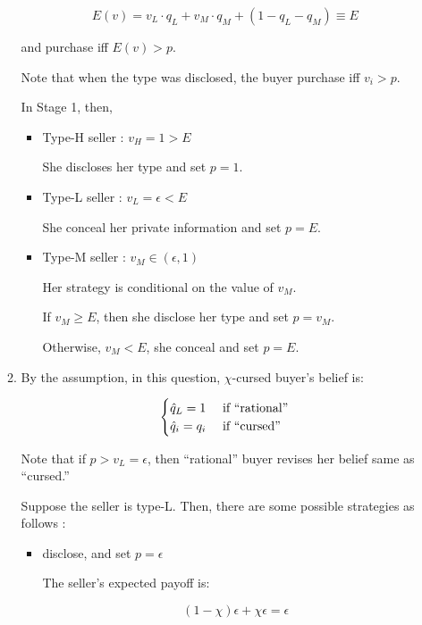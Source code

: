\documentclass{jsarticle}
\begin{document}
\begin{enumerate}
\begin{enumerate}
  \[E(v) = v_L \cdot q_L + v_M \cdot q_M + (1 - q_L - q_M) \equiv E \]
 
 and purchase iff $E(v) > p$.
 
 Note that when the type was disclosed, the buyer purchase iff $v_i > p$.
 
 \hspace{2zw} In Stage 1, then, 
 
  \begin{itemize}
  
  \item Type-H seller : $v_H =1 > E $
  
  She discloses her type and set $p = 1$.
  
  \item Type-L seller : $v_L = \epsilon < E$
  
  She conceal her private information and set $p = E$.
  
  \item Type-M seller : $v_M \in (\epsilon, 1)$
  
  Her strategy is conditional on the value of $v_M$.
  
  If $v_M \geq E$, then she disclose her type and set $p = v_M$.
  
  Otherwise, $v_M < E$, she conceal and set $p = E$.
  
  \end{itemize}
 
\vspace{1zw}

 \item By the assumption, in this question, $\chi$-cursed buyer's belief is:
 
 \[ \begin{cases}
 \Hat{q}_L = 1 & \text{ if ``rational''} \\
 \Hat{q}_i = q_i & \text{ if ``cursed''}
 \end{cases} \]
   
  Note that if $p > v_L = \epsilon$, then ``rational'' buyer revises her belief same as ``cursed.''
  
  Suppose the seller is type-L. Then, there are some possible strategies as follows :
  
   \begin{itemize}
   
   \item disclose, and set $p = \epsilon$
   
   The seller's expected payoff is:
   
   \[ (1 - \chi ) \epsilon + \chi \epsilon = \epsilon \]
   

\end{itemize}
\end{enumerate}
\end{enumerate}
\end{document}
